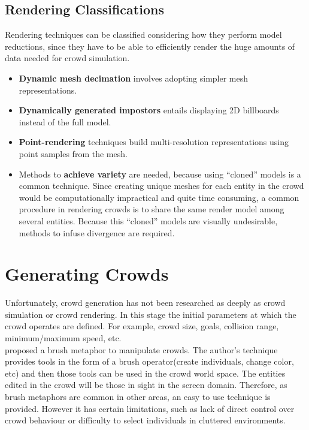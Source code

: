\documentclass[6pt]{article} %
\begin{document}
\begin{multicols}{2}
\subsection{Rendering Classifications}
\label{subsec:RenderingClassification}

Rendering techniques can be classified considering how they perform model reductions, since they have to be able to efficiently render the huge amounts of data needed for crowd simulation.\\

\begin{itemize}
\item \textbf{Dynamic mesh decimation} involves adopting simpler mesh representations.
\item \textbf{Dynamically generated impostors} entails displaying 2D billboards instead of the full model.
\item \textbf{Point-rendering} techniques build multi-resolution representations using point samples from the mesh.
\item Methods to \textbf{achieve variety} are needed, because using ``cloned'' models is a common technique. Since creating unique meshes for each entity in the crowd would be computationally impractical and quite time consuming, a common procedure in rendering crowds is to share the same render model among several entities.
Because this ``cloned'' models are visually undesirable, methods to infuse divergence are required.
\end{itemize}
  

\section{Generating Crowds}
\label{sec:CrowdGen}

Unfortunately, crowd generation has not been researched as deeply as crowd simulation or crowd rendering.
In this stage the initial parameters at which the crowd operates are defined.
For example, crowd size, goals, collision range, minimum/maximum speed, etc.\\

\cite{Ulicny2004} proposed a brush metaphor to manipulate crowds.
The author's technique provides tools in the form of a brush operator(create individuals, change color, etc) and then those tools can be used in the crowd world space.
The entities edited in the crowd will be those in sight in the screen domain.
Therefore, as brush metaphors are common in other areas, an easy to use technique is provided.
However it has certain limitations, such as lack of direct control over crowd behaviour or difficulty to select individuals in cluttered environments.\\


\end{multicols}
\end{document}
